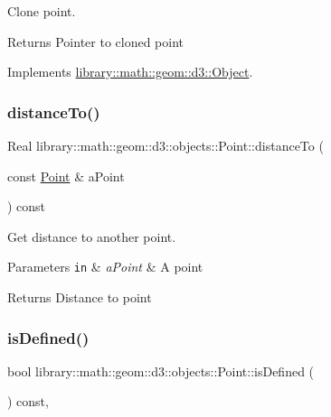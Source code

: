 Clone point. 

\begin{DoxyReturn}{Returns}
Pointer to cloned point 
\end{DoxyReturn}


Implements \hyperlink{classlibrary_1_1math_1_1geom_1_1d3_1_1_object_a1a784c6b359e0eb97cd34fabc42f2f3f}{library\+::math\+::geom\+::d3\+::\+Object}.

\mbox{\label{classlibrary_1_1math_1_1geom_1_1d3_1_1objects_1_1_point_a0108b685599f2684837d2898250c5a36}} 
\subsubsection{\texorpdfstring{distance\+To()}{distanceTo()}}
{\footnotesize\ttfamily Real library\+::math\+::geom\+::d3\+::objects\+::\+Point\+::distance\+To (\begin{DoxyParamCaption}\item[{const \hyperlink{classlibrary_1_1math_1_1geom_1_1d3_1_1objects_1_1_point}{Point} \&}]{a\+Point }\end{DoxyParamCaption}) const}



Get distance to another point. 


\begin{DoxyParams}[1]{Parameters}
\mbox{\tt in}  & {\em a\+Point} & A point \\
\hline
\end{DoxyParams}
\begin{DoxyReturn}{Returns}
Distance to point 
\end{DoxyReturn}
\mbox{\label{classlibrary_1_1math_1_1geom_1_1d3_1_1objects_1_1_point_a9874289efeb457ada4b32d7eb1e012f6}} 
\subsubsection{\texorpdfstring{is\+Defined()}{isDefined()}}
{\footnotesize\ttfamily bool library\+::math\+::geom\+::d3\+::objects\+::\+Point\+::is\+Defined (\begin{DoxyParamCaption}{ }\end{DoxyParamCaption}) const\hspace{0.3cm}{\ttfamily [override]}, {\ttfamily [virtual]}}



